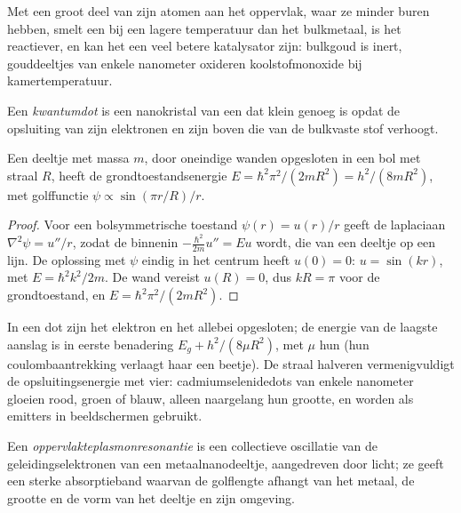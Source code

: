 Met een groot deel van zijn atomen aan het oppervlak, waar ze minder
buren hebben, smelt een  bij een lagere temperatuur dan het
bulkmetaal, is het reactiever, en kan het een veel betere katalysator
zijn: bulkgoud is inert, gouddeeltjes van enkele nanometer oxideren
koolstofmonoxide bij kamertemperatuur.

\begin{definition}[Kwantumdots]\label{def:b3:inorganic-materials:quantum-dot}
Een \emph{kwantumdot} is een nanokristal van een
 dat klein genoeg is opdat de opsluiting van zijn elektronen
en  zijn  boven die van de bulkvaste stof verhoogt.
\end{definition}

\begin{theorem}\label{thm:b3:inorganic-materials:quantum-dot}
Een deeltje met massa $m$, door oneindige wanden opgesloten in een bol met straal $R$, heeft
de grondtoestandsenergie $E = \hbar^2\pi^2/(2mR^2) = h^2/(8mR^2)$, met golffunctie $\psi \propto \sin(\pi r/R)/r$.
\end{theorem}

\begin{proof}
Voor een bolsymmetrische toestand $\psi(r) = u(r)/r$ geeft de laplaciaan
$\nabla^2\psi = u''/r$, zodat de  binnenin $-\frac{\hbar^2}{2m}u'' = Eu$ wordt, die van een deeltje op een
lijn. De oplossing met $\psi$ eindig in het centrum heeft $u(0) = 0$: $u = \sin(kr)$, met $E = \hbar^2k^2/2m$.
De wand vereist $u(R) = 0$, dus $kR = \pi$ voor de grondtoestand, en $E = \hbar^2\pi^2/(2mR^2)$.
\end{proof}

In een dot zijn het elektron en het  allebei opgesloten; de energie van
de laagste aanslag is in eerste benadering $E_g + h^2/(8\mu R^2)$, met $\mu$ hun  (hun coulombaantrekking verlaagt haar een beetje). De straal
halveren vermenigvuldigt de opsluitingsenergie met vier:
cadmiumselenidedots van enkele nanometer gloeien rood, groen of blauw,
alleen naargelang hun grootte, en worden als emitters in beeldschermen
gebruikt.

\begin{definition}[Oppervlakteplasmonresonantie]\label{def:b3:inorganic-materials:plasmon}
Een \emph{oppervlakteplasmonresonantie}
is een collectieve oscillatie van de geleidingselektronen van een
metaalnanodeeltje, aangedreven door licht; ze geeft een sterke
absorptieband waarvan de golflengte afhangt van het metaal, de grootte en
de vorm van het deeltje en zijn omgeving.
\end{definition}

